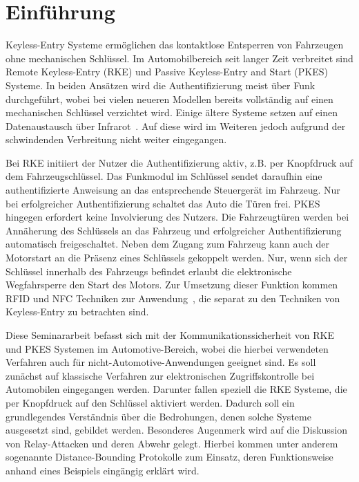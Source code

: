 \chapter{Einführung}

\foreignlanguage{english}{Keyless-Entry} Systeme ermöglichen das kontaktlose Entsperren von Fahrzeugen ohne mechanischen Schlüssel. Im Automobilbereich seit langer Zeit verbreitet sind \foreignlanguage{english}{Remote Keyless-Entry} (RKE) und \foreignlanguage{english}{Passive Keyless-Entry and Start} (PKES) Systeme. In beiden Ansätzen wird die Authentifizierung meist über Funk durchgeführt, wobei bei vielen neueren Modellen bereits vollständig auf einen mechanischen Schlüssel verzichtet wird. Einige ältere Systeme setzen auf einen Datenaustausch über Infrarot~\cite[S.\ 930]{Garcia2016}. Auf diese wird im Weiteren jedoch aufgrund der schwindenden Verbreitung nicht weiter eingegangen.

Bei RKE initiiert der Nutzer die Authentifizierung aktiv, z.B. per Knopfdruck auf dem Fahrzeugschlüssel. Das Funkmodul im Schlüssel sendet daraufhin eine authentifizierte Anweisung an das entsprechende Steuergerät im Fahrzeug. Nur bei erfolgreicher Authentifizierung schaltet das Auto die Türen frei. PKES hingegen erfordert keine Involvierung des Nutzers. Die Fahrzeugtüren werden bei Annäherung des Schlüssels an das Fahrzeug und erfolgreicher Authentifizierung automatisch freigeschaltet. Neben dem Zugang zum Fahrzeug kann auch der Motorstart an die Präsenz eines Schlüssels gekoppelt werden. Nur, wenn sich der Schlüssel innerhalb des Fahrzeugs befindet erlaubt die elektronische Wegfahrsperre den Start des Motors. Zur Umsetzung dieser Funktion kommen RFID und NFC Techniken zur Anwendung~\cite{Rainer2010}, die separat zu den Techniken von \foreignlanguage{english}{Keyless-Entry} zu betrachten sind.

Diese Seminararbeit befasst sich mit der Kommunikationssicherheit von RKE und PKES Systemen im Automotive-Bereich, wobei die hierbei verwendeten Verfahren auch für nicht-Automotive-Anwendungen geeignet sind. Es soll zunächst auf klassische Verfahren zur elektronischen Zugriffskontrolle bei Automobilen eingegangen werden. Darunter fallen speziell die RKE Systeme, die per Knopfdruck auf den Schlüssel aktiviert werden. Dadurch soll ein grundlegendes Verständnis über die Bedrohungen, denen solche Systeme ausgesetzt sind, gebildet werden. Besonderes Augenmerk wird auf die Diskussion von \foreignlanguage{english}{Relay}-Attacken und deren Abwehr gelegt. Hierbei kommen unter anderem sogenannte \foreignlanguage{english}{Distance-Bounding} Protokolle zum Einsatz, deren Funktionsweise anhand eines Beispiels eingängig erklärt wird.
